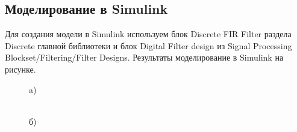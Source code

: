 \documentclass[10pt,a4paper]{article}
\begin{document}
\subsection{Моделирование в Simulink}
Для создания модели в Simulink используем блок Discrete FIR Filter раздела Discrete главной библиотеки и блок Digital Filter design из Signal Processing Blockset/Filtering/Filter Designs. Результаты моделирование в Simulink на рисунке.
\begin{figure}[H]
\begin{minipage}[h]{0.6\linewidth}
 a) \\
\end{minipage}
\hfill
\begin{minipage}[h]{0.6\linewidth}
 \\б)

\end{minipage}
\end{figure}
\end{document}
